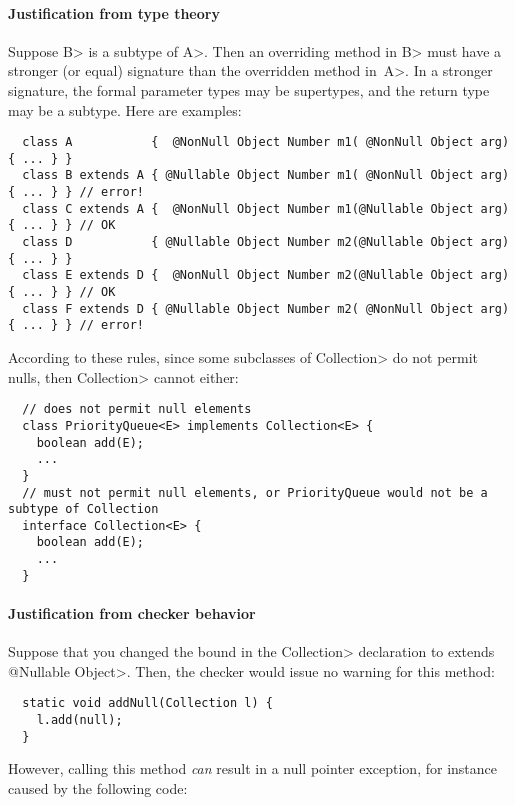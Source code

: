 \paragraph{Justification from type theory}
Suppose \<B> is a subtype of \<A>.
Then an overriding method in \<B> must have a stronger (or equal) signature
than the overridden method in~\<A>.  In a stronger signature, the formal
parameter types may be supertypes, and the return type may be a subtype.
Here are examples:

\begin{Verbatim}
  class A           {  @NonNull Object Number m1( @NonNull Object arg) { ... } }
  class B extends A { @Nullable Object Number m1( @NonNull Object arg) { ... } } // error!
  class C extends A {  @NonNull Object Number m1(@Nullable Object arg) { ... } } // OK
  class D           { @Nullable Object Number m2(@Nullable Object arg) { ... } }
  class E extends D {  @NonNull Object Number m2(@Nullable Object arg) { ... } } // OK
  class F extends D { @Nullable Object Number m2( @NonNull Object arg) { ... } } // error!
\end{Verbatim}

According to these rules, since some subclasses of \<Collection> do not
permit nulls, then \<Collection> cannot either:

\begin{Verbatim}
  // does not permit null elements
  class PriorityQueue<E> implements Collection<E> {
    boolean add(E);
    ...
  }
  // must not permit null elements, or PriorityQueue would not be a subtype of Collection
  interface Collection<E> {
    boolean add(E);    
    ...
  }
\end{Verbatim}


\paragraph{Justification from checker behavior}

Suppose that you changed the bound in the \<Collection> declaration to
\<extends @Nullable Object>.  Then, the checker would issue no warning for
this method:

\begin{Verbatim}
  static void addNull(Collection l) {
    l.add(null);
  }
\end{Verbatim}

\noindent
However, calling this method \emph{can} result in a null pointer exception,
for instance caused by the following code:

